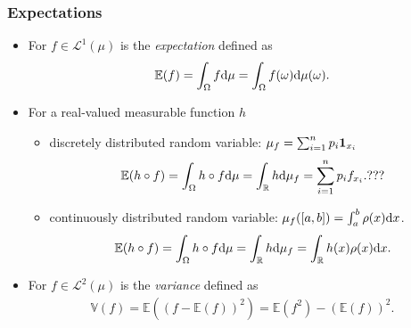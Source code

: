\documentclass[oneside]{article}
\numberwithin{equation}{section}
\begin{document}
\subsubsection{Expectations}
\begin{itemize}
    \item For $f\in\mathcal{L}^1(\mu)$ is the \textit{expectation} defined as
    \begin{align*}
        \mathbb{E}(f) = \int_\Omega f{\rm d}\mu = \int_\Omega f(\omega){\rm d}\mu(\omega).
    \end{align*}
    \item For a real-valued measurable function $h$
    \begin{itemize}
        \item discretely distributed random variable: $\mu_f = \sum_{i=1}^n p_i{\bf 1}_{x_i}$
        \begin{align*}
            \mathbb{E}(h\circ f) = \int_\Omega h\circ f{\rm d}\mu = \int_\mathbb{R} h{\rm d}\mu_f = \sum_{i=1}^n p_if_{x_i}.???
        \end{align*}
        \item continuously distributed random variable: $\mu_f([a,b]) = \int_a^b \rho(x){\rm d}x$.
        \begin{align*}
            \mathbb{E}(h\circ f) = \int_\Omega h\circ f{\rm d}\mu = \int_\mathbb{R} h{\rm d}\mu_f = \int_\mathbb{R} h(x)\rho(x){\rm d}x.
        \end{align*}
    \end{itemize}
    \item For $f\in\mathcal{L}^2(\mu)$ is the \textit{variance} defined as
    \begin{align*}
        \mathbb{V}(f) = \mathbb{E}((f - \mathbb{E}(f))^2) = \mathbb{E}(f^2) - (\mathbb{E}(f))^2.
    \end{align*}
\end{itemize}
\end{document}
